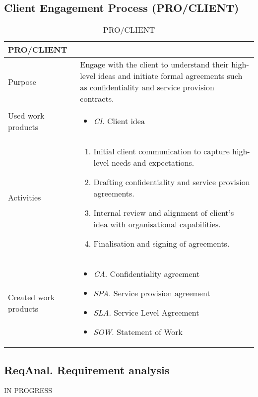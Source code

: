 \subsection{Client Engagement Process (PRO/CLIENT)}
\begin{table}[h!]
\begin{tabular}{l|p{}}
\hline
\textbf{PRO/CLIENT}        & \textbf{} \\ \hline
Purpose &  Engage with the client to understand their high-level ideas and initiate formal agreements such as confidentiality and service provision contracts. \\ \hline
Used work products    &      
\begin{itemize}
    \item \textit{CI}. Client idea
\end{itemize}
\\ \hline
Activities            &   
\begin{enumerate}
     \item Initial client communication to capture high-level needs and expectations.
    \item Drafting confidentiality and service provision agreements.
    \item Internal review and alignment of client's idea with organisational capabilities.
    \item Finalisation and signing of agreements.
\end{enumerate}
\\ \hline
Created work products &     
\begin{itemize}
    \item \textit{CA}. Confidentiality agreement
    \item \textit{SPA}. Service provision agreement
    \item \textit{SLA}. Service Level Agreement
    \item \textit{SOW}. Statement of Work
\end{itemize}
\end{tabular}
\caption{PRO/CLIENT}
\label{pro/sign}
\end{table}

\subsection{ReqAnal. Requirement analysis} %

IN PROGRESS \\

